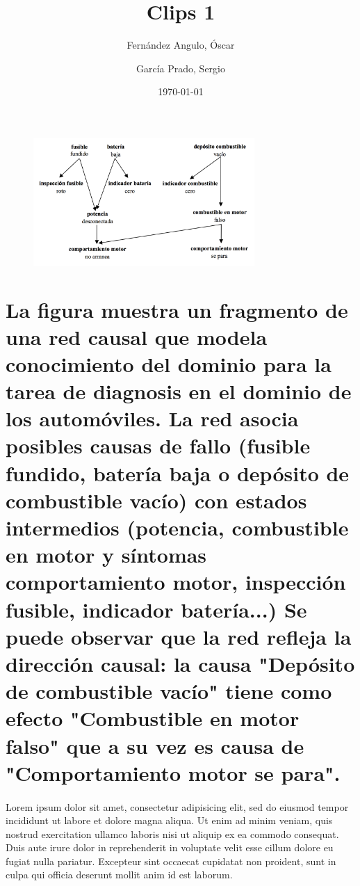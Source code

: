 \documentclass[10pt, a4paper,spanish]{article}
\title{\vspace{-15mm}\fontsize{24pt}{10pt}\selectfont\textbf{Clips 1}} %
\author{
	Fernández Angulo, Óscar \\
	\and
	García Prado, Sergio
}
\date{\today}
\begin{document}
	\maketitle %

	\thispagestyle{fancy} %




	\begin{figure}[H]
		\begin{center}
			\includegraphics[width=0.75\textwidth]{exercise-3-network}
		\end{center}
	\end{figure}

    \section{La figura muestra un fragmento de una red causal que modela conocimiento del dominio para la tarea de diagnosis en el dominio de los automóviles. La red asocia posibles causas de fallo (fusible fundido, batería baja o depósito de combustible vacío) con estados intermedios (potencia, combustible en motor y síntomas comportamiento motor, inspección fusible, indicador batería...) Se puede observar que la red refleja la dirección causal: la causa "Depósito de combustible vacío" tiene como efecto "Combustible en motor falso" que a su vez es causa de "Comportamiento motor se para".}

        \paragraph{}
		Lorem ipsum dolor sit amet, consectetur adipisicing elit, sed do eiusmod tempor incididunt ut labore et dolore magna aliqua. Ut enim ad minim veniam, quis nostrud exercitation ullamco laboris nisi ut aliquip ex ea commodo consequat. Duis aute irure dolor in reprehenderit in voluptate velit esse cillum dolore eu fugiat nulla pariatur. Excepteur sint occaecat cupidatat non proident, sunt in culpa qui officia deserunt mollit anim id est laborum.
\end{document}
